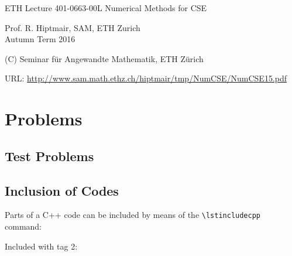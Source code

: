 \documentclass[12pt]{report}
\begin{document}
\begin{tcolorbox}[colframe=black]
\begin{minipage}[t][0.6\textwidth][c]{\textwidth}
  ETH Lecture 401-0663-00L  Numerical Methods for CSE 
  \B\vspace{1.5cm}
  
  \begin{center}
  \end{center}
  \vspace{1.5cm}
  
  \begin{center}
  \begin{large}
    {\Large Prof. R. Hiptmair, SAM, ETH Zurich}\\[1.5ex]

    Autumn Term 2016 %

    (C) Seminar f\"ur Angewandte Mathematik, ETH Z\"urich
    \samskip

    URL: \href{http://www.sam.math.ethz.ch/~hiptmair/tmp/NumCSE/NumCSE15.pdf}{%
      http://www.sam.math.ethz.ch/hiptmair/tmp/NumCSE/NumCSE15.pdf}
  \end{large}
\end{center}
\end{minipage}
\end{tcolorbox}
\bigskip



\chapter{Problems}

\section{Test Problems}

%

\section{Inclusion of Codes}

Parts of a C++ code can be included by means of the \verb|\lstincludecpp| command:

Included with tag 2:
\end{document}

